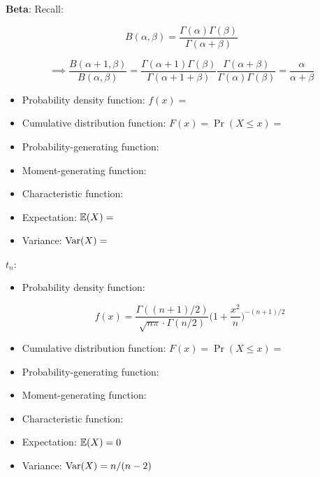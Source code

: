 \textbf{Beta}: Recall:

\[
B(\alpha, \beta) = \frac{\Gamma(\alpha) \Gamma(\beta)}{\Gamma(\alpha + \beta)}
\]

\[
\implies \frac{B(\alpha + 1, \beta)}{B(\alpha, \beta)} = \frac{\Gamma(\alpha + 1) \Gamma(\beta)}{\Gamma(\alpha + 1 + \beta)} \frac{\Gamma(\alpha + \beta)}{\Gamma(\alpha)\Gamma(\beta)} = \frac{\alpha}{\alpha + \beta}
\]

\begin{itemize}

\item Probability density function: \(f(x) = \)

\item Cumulative distribution function: \(F(x) = \Pr(X \leq x) = \)

\item Probability-generating function:

\item Moment-generating function:

\item Characteristic function:

\item Expectation: \(\E(X) = \)

\item Variance: \(\Var(X) = \)

\end{itemize}

\textbf{\(t_n\)}:

\begin{itemize}

\item Probability density function: 

\[
f(x)  = \frac{\Gamma((n+1)/2)}{\sqrt{n \pi} \cdot \Gamma(n/2)} \bigg( 1 + \frac{x^2}{n} \bigg)^{-(n+1)/2}
\]

\item Cumulative distribution function: \(F(x) = \Pr(X \leq x) = \)

\item Probability-generating function:

\item Moment-generating function:

\item Characteristic function:

\item Expectation: \(\E(X) = 0  \)

\item Variance: \(\Var(X) = n/(n-2)\)

\end{itemize}

